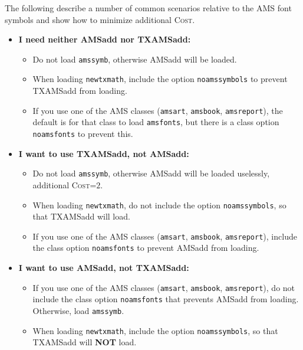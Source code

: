 \documentclass[\fsc]{article}
\theoremstyle{oldplain}
\theoremstyle{plain}
\begin{document}
The following describe a number of common scenarios relative to the AMS font symbols and show how to minimize additional \textsc{Cost}.
\begin{itemize}
\item
\textbf{I need neither \textsf{AMSadd} nor \textsf{TXAMSadd}:} 
\begin{itemize}
\item
Do not load {\tt amssymb}, otherwise \textsf{AMSadd} will be loaded.
\item When loading {\tt newtxmath}, include the option {\tt noamssymbols} to prevent \textsf{TXAMSadd} from loading.
\item If you use one of the AMS classes ({\tt amsart}, {\tt amsbook}, {\tt amsreport}), the default is for that class to load {\tt amsfonts}, but there is a class option {\tt noamsfonts} to prevent this. 
\end{itemize}
\item
\textbf{I want to use \textsf{TXAMSadd}, not \textsf{AMSadd}:} 
\begin{itemize}
\item
Do not load {\tt amssymb}, otherwise \textsf{AMSadd} will be loaded uselessly, additional \textsc{Cost}=$2$.
\item When loading {\tt newtxmath}, do not include the option {\tt noamssymbols}, so that \textsf{TXAMSadd} will load.
\item If you use one of the AMS classes ({\tt amsart}, {\tt amsbook}, {\tt amsreport}), include the class option {\tt noamsfonts} to prevent \textsf{AMSadd} from loading. 
\end{itemize}
\item
\textbf{I want to use \textsf{AMSadd}, not \textsf{TXAMSadd}:} 
\begin{itemize}
\item If you use one of the AMS classes ({\tt amsart}, {\tt amsbook}, {\tt amsreport}), do not include the class option {\tt noamsfonts} that prevents \textsf{AMSadd} from loading. Otherwise, load {\tt amssymb}.
\item When loading {\tt newtxmath}, include the option {\tt noamssymbols}, so that \textsf{TXAMSadd} will {\bf NOT} load.
\end{itemize}
\end{itemize}
\end{document}

